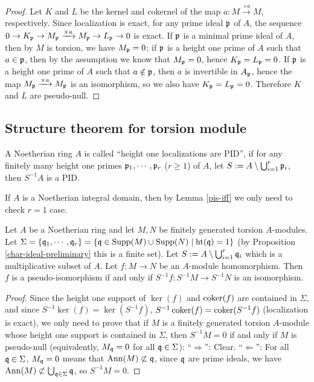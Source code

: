 \begin{proof}
\leanok
Let $K$ and $L$ be the kernel and cokernel of the map
$a:M\xrightarrow{\times a}M$, respectively.
Since localization is exact, for any prime ideal ${\mathfrak{p}}$ of $A$,
the sequence $0\to K_{\mathfrak{p}}\to M_{\mathfrak{p}}\xrightarrow{\times a}M_{\mathfrak{p}}\to L_{\mathfrak{p}}\to 0$
is exact.
If ${\mathfrak{p}}$ is a minimal prime ideal of $A$, then by $M$ is torsion,
we have $M_{\mathfrak{p}}=0$; if ${\mathfrak{p}}$ is a height one prime of $A$
such that $a\in{\mathfrak{p}}$, then by the assumption we know that $M_{\mathfrak{p}}=0$,
hence $K_{\mathfrak{p}}=L_{\mathfrak{p}}=0$.
If ${\mathfrak{p}}$ is a height one prime of $A$
such that $a\notin{\mathfrak{p}}$, then $a$ is invertible in $A_{\mathfrak{p}}$,
hence the map $M_{\mathfrak{p}}\xrightarrow{\times a}M_{\mathfrak{p}}$ is an isomorphism,
so we also have $K_{\mathfrak{p}}=L_{\mathfrak{p}}=0$.
Therefore $K$ and $L$ are pseudo-null.
\end{proof}

\subsection{Structure theorem for torsion module}

\begin{definition}
\label{ht-1-localization-is-PID}
\leanok
A Noetherian ring $A$ is called
``height one localizations are PID'', if
for any finitely many height one primes ${\mathfrak{p}}_1,\cdots,{\mathfrak{p}}_r$ ($r\geq 1$) of $A$,
let $S:=A\setminus\bigcup_{i=1}^r{\mathfrak{p}}_i$, then $S^{-1}A$ is a PID.
\end{definition}

If $A$ is a Noetherian integral domain, then by Lemma \ref{pis-iff} we
only need to check $r=1$ case.

\begin{lem}
\label{pis-iff}
\leanok
Let $A$ be a Noetherian ring and let
$M,N$ be finitely generated torsion $A$-modules.
Let $\Sigma=\{{\mathfrak{q}}_1,\cdots,{\mathfrak{q}}_r\}
=\{{\mathfrak{q}}\in{\mathrm{Supp}}(M)\cup{\mathrm{Supp}}(N)\mid{\mathrm{ht}}({\mathfrak{q}})=1\}$
(by Proposition \ref{char-ideal-preliminary} this is a finite set).
Let $S:=A\setminus\bigcup_{i=1}^r{\mathfrak{q}}_i$ which is a multiplicative subset of $A$.
Let $f:M\to N$ be an $A$-module homomorphism.
Then $f$ is a pseudo-isomorphism if and only if $S^{-1}f:S^{-1}M\to S^{-1}N$
is an isomorphism.
\end{lem}

\begin{proof}
\leanok
Since the height one support of $\ker(f)$ and $\operatorname{coker}(f)$
are contained in $\Sigma$,
and since $S^{-1}\ker(f)=\ker(S^{-1}f)$,
$S^{-1}\operatorname{coker}(f)=\operatorname{coker}(S^{-1}f)$ (localization is exact),
we only need to prove that if $M$ is a finitely generated torsion $A$-module
whose height one support is contained in $\Sigma$,
then $S^{-1}M=0$ if and only if $M$ is pseudo-null (equivalently, $M_{\mathfrak{q}}=0$
for all ${\mathfrak{q}}\in\Sigma$):
``$\Rightarrow$'': Clear.
``$\Leftarrow$'': For all ${\mathfrak{q}}\in\Sigma$, $M_{\mathfrak{q}}=0$ means that ${\mathrm{Ann}}(M)\not\subset{\mathfrak{q}}$,
since ${\mathfrak{q}}$ are prime ideals, we have ${\mathrm{Ann}}(M)\not\subset\bigcup_{{\mathfrak{q}}\in\Sigma}{\mathfrak{q}}$,
so $S^{-1}M=0$.
\end{proof}

